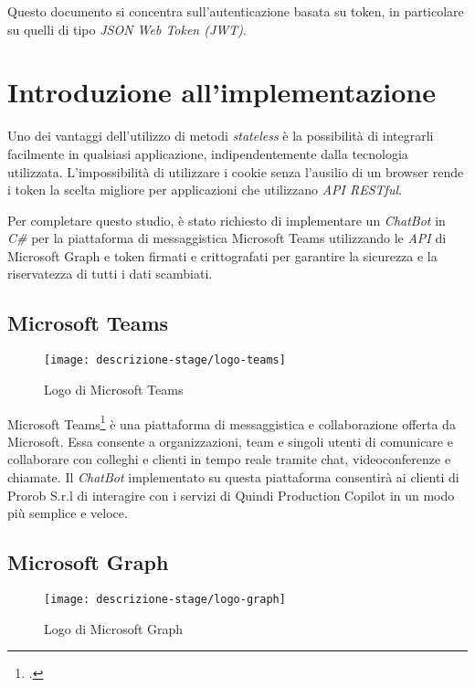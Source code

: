 \noindent Questo documento si concentra sull'autenticazione basata su token, in particolare su quelli di tipo \emph{JSON Web Token (JWT)}.


\section{Introduzione all'implementazione}
Uno dei vantaggi dell'utilizzo di metodi \emph{stateless} è la possibilità di integrarli facilmente in qualsiasi applicazione, indipendentemente dalla tecnologia utilizzata.
L'impossibilità di utilizzare i cookie senza l'ausilio di un browser rende i token la scelta migliore per applicazioni che utilizzano \emph{API RESTful}.

Per completare questo studio, è stato richiesto di implementare un \emph{ChatBot} in \emph{C\#} per la piattaforma di messaggistica Microsoft Teams utilizzando le \emph{API} di Microsoft Graph e token firmati e crittografati per garantire la sicurezza e la riservatezza di tutti i dati scambiati.

\subsection{Microsoft Teams}

\begin{figure}[!ht] 
	\centering 
	\texttt{[image: descrizione-stage/logo-teams]} 
	\caption{Logo di Microsoft Teams}
\end{figure}

Microsoft Teams\footcite{site:microsoft-teams} è una piattaforma di messaggistica e collaborazione offerta da Microsoft.
Essa consente a organizzazioni, team e singoli utenti di comunicare e collaborare con colleghi e clienti in tempo reale tramite chat, videoconferenze e chiamate.
Il \emph{ChatBot} implementato su questa piattaforma consentirà ai clienti di Prorob S.r.l di interagire con i servizi di Quindi Production Copilot in un modo più semplice e veloce.

\subsection{Microsoft Graph}

\begin{figure}[!ht] 
	\centering 
	\texttt{[image: descrizione-stage/logo-graph]} 
	\caption{Logo di Microsoft Graph}
\end{figure}

